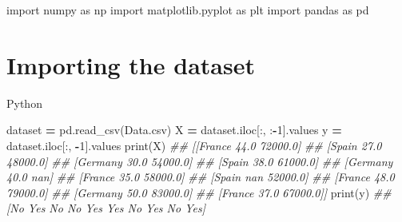 \documentclass[
]{book}
\newenvironment{Shaded}{\begin{snugshade}}{\end{snugshade}}
\newcommand{\BuiltInTok}[1]{#1}
\newcommand{\CommentTok}[1]{\textcolor[rgb]{0.56,0.35,0.01}{\textit{#1}}}
\newcommand{\DecValTok}[1]{\textcolor[rgb]{0.00,0.00,0.81}{#1}}
\newcommand{\ImportTok}[1]{#1}
\newcommand{\NormalTok}[1]{#1}
\newcommand{\OperatorTok}[1]{\textcolor[rgb]{0.81,0.36,0.00}{\textbf{#1}}}
\newcommand{\StringTok}[1]{\textcolor[rgb]{0.31,0.60,0.02}{#1}}
\theoremstyle{definition}
\theoremstyle{definition}
\theoremstyle{definition}
\theoremstyle{definition}
\theoremstyle{remark}
\begin{document}
\begin{Shaded}
\begin{Highlighting}[]
\ImportTok{import}\NormalTok{ numpy }\ImportTok{as}\NormalTok{ np}
\ImportTok{import}\NormalTok{ matplotlib.pyplot }\ImportTok{as}\NormalTok{ plt}
\ImportTok{import}\NormalTok{ pandas }\ImportTok{as}\NormalTok{ pd}
\end{Highlighting}
\end{Shaded}

\hypertarget{importing-the-dataset}{%
\section{Importing the dataset}\label{importing-the-dataset}}

Python

\begin{Shaded}
\begin{Highlighting}[]
\NormalTok{dataset }\OperatorTok{=}\NormalTok{ pd.read\_csv(}\StringTok{\textquotesingle{}Data.csv\textquotesingle{}}\NormalTok{)}
\NormalTok{X }\OperatorTok{=}\NormalTok{ dataset.iloc[:, :}\OperatorTok{{-}}\DecValTok{1}\NormalTok{].values}
\NormalTok{y }\OperatorTok{=}\NormalTok{ dataset.iloc[:, }\OperatorTok{{-}}\DecValTok{1}\NormalTok{].values}
\BuiltInTok{print}\NormalTok{(X)}
\CommentTok{\#\# [[\textquotesingle{}France\textquotesingle{} 44.0 72000.0]}
\CommentTok{\#\#  [\textquotesingle{}Spain\textquotesingle{} 27.0 48000.0]}
\CommentTok{\#\#  [\textquotesingle{}Germany\textquotesingle{} 30.0 54000.0]}
\CommentTok{\#\#  [\textquotesingle{}Spain\textquotesingle{} 38.0 61000.0]}
\CommentTok{\#\#  [\textquotesingle{}Germany\textquotesingle{} 40.0 nan]}
\CommentTok{\#\#  [\textquotesingle{}France\textquotesingle{} 35.0 58000.0]}
\CommentTok{\#\#  [\textquotesingle{}Spain\textquotesingle{} nan 52000.0]}
\CommentTok{\#\#  [\textquotesingle{}France\textquotesingle{} 48.0 79000.0]}
\CommentTok{\#\#  [\textquotesingle{}Germany\textquotesingle{} 50.0 83000.0]}
\CommentTok{\#\#  [\textquotesingle{}France\textquotesingle{} 37.0 67000.0]]}
\BuiltInTok{print}\NormalTok{(y)}
\CommentTok{\#\# [\textquotesingle{}No\textquotesingle{} \textquotesingle{}Yes\textquotesingle{} \textquotesingle{}No\textquotesingle{} \textquotesingle{}No\textquotesingle{} \textquotesingle{}Yes\textquotesingle{} \textquotesingle{}Yes\textquotesingle{} \textquotesingle{}No\textquotesingle{} \textquotesingle{}Yes\textquotesingle{} \textquotesingle{}No\textquotesingle{} \textquotesingle{}Yes\textquotesingle{}]}
\end{Highlighting}
\end{Shaded}
\end{document}
